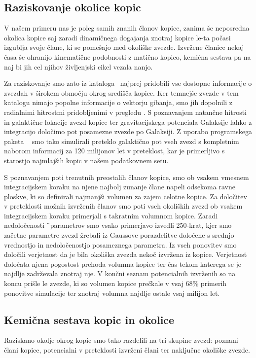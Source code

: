 \subsection{Raziskovanje okolice kopic}
V našem primeru nas je poleg samih znanih članov kopice, zanima še neposredna okolica kopice saj zaradi dinamičnega dogajanja znotraj kopice le-ta počasi izgublja svoje člane, ki se pomešajo med okoliške zvezde. Izvržene članice nekaj časa še ohranijo kinematične podobnosti z matično kopico, kemična sestava pa na naj bi jih cel njihov življenjski cikel vezala nanjo. 

Za raziskovanje smo zato iz kataloga \Gs\ najprej pridobili vse dostopne informacije o zvezdah v širokem območju okrog središča kopice. Ker temnejše zvezde v tem katalogu nimajo popolne informacije o vektorju gibanja, smo jih dopolnili z radialnimi hitrostmi pridobljenimi v pregledu \Gh. S poznavanjem natančne hitrosti in galaktične lokacije zvezd kopice ter gravitacijskega potenciala Galaksije lahko z integracijo določimo pot posamezne zvezde po Galaksiji. Z uporabo programskega paketa \GP\ \cite{2015ApJS..216...29B} smo tako simulirali preteklo galaktično pot vseh zvezd s kompletnim naborom informacij za 120 milijonov let v preteklost, kar je primerljivo s starostjo najmlajših kopic v našem podatkovnem setu.

S poznavanjem poti trenutnih preostalih članov kopice, smo ob vsakem vmesnem integracijskem koraku na njene najbolj zunanje člane napeli odsekoma ravne ploskve, ki so definirali najmanjši volumen za zajem celotne kopice. Za določitev v preteklosti možnih izvrženih članov smo poti vseh okoliških zvezd ob vsakem integracijskem koraku primerjali s takratnim volumnom kopice. Zaradi nedoločenosti \G\ parametrov smo vsako primerjavo izvedli 250-krat, kjer smo začetne parametre zvezd žrebali iz Gaussove porazdelitve določene s srednjo vrednostjo in nedoločenostjo posameznega parametra. Iz vseh ponovitev smo določili verjetnost da je bila okoliška zvezda nekoč izvržena iz kopice. Verjetnost določata njena pogostost prehoda volumna kopice ter čas tekom katerega se je najdlje zadrževala znotraj nje. V končni seznam potencialnih izvrženih so na koncu prišle le zvezde, ki so volumen kopice prečkale v vsaj $68$\% primerih ponovitve simulacije ter znotraj volumna najdlje ostale vsaj milijon let.

\subsection{Kemična sestava kopic in okolice}
Raziskano okolje okrog kopic smo tako razdelili na tri skupine zvezd: poznani člani kopice, potencialni v preteklosti izvrženi člani ter naključne okoliške zvezde. 

